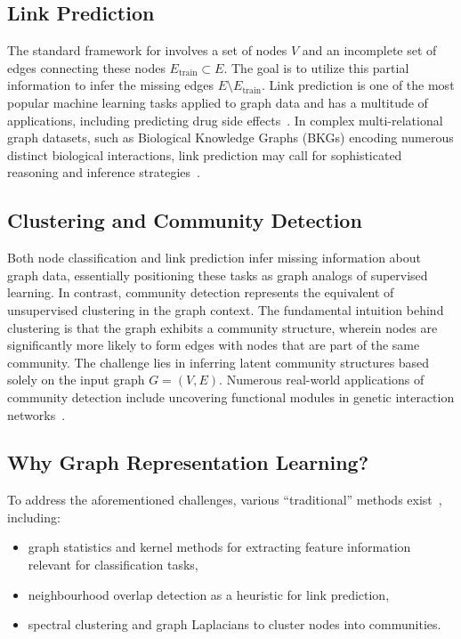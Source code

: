 \subsection{Link Prediction}
The standard framework for  involves a set of nodes $ V $ and an incomplete set of edges connecting these nodes $ E_\text{train} \subset E $. The goal is to utilize this partial information to infer the missing edges $ E \setminus E_\text{train} $. Link prediction is one of the most popular machine learning tasks applied to graph data and has a multitude of applications, including predicting drug side effects~\cite{Zitnik2018ModelingPolypharmacySideEffectsGCN}. In complex multi-relational graph datasets, such as Biological Knowledge Graphs (BKGs) encoding numerous distinct biological interactions, link prediction may call for sophisticated reasoning and inference strategies~\cite{Nickel2015ReviewRelationalMLKG}.

\subsection{Clustering and Community Detection}
Both node classification and link prediction infer missing information about graph data, essentially positioning these tasks as graph analogs of supervised learning. In contrast, community detection represents the equivalent of unsupervised clustering in the graph context. The fundamental intuition behind clustering is that the graph exhibits a community structure, wherein nodes are significantly more likely to form edges with nodes that are part of the same community. The challenge lies in inferring latent community structures based solely on the input graph $ G = (V, E) $. Numerous real-world applications of community detection include uncovering functional modules in genetic interaction networks~\cite{Agrawal2018LargeScaleAnalysisDiseasePathwaysHumanInteractome}.

\subsection{Why Graph Representation Learning?}
To address the aforementioned challenges, various ``traditional'' methods exist~\cite{Hamilton2020GraphRL}, including:
\begin{itemize}
    \item graph statistics and kernel methods for extracting feature information relevant for classification tasks,
    \item neighbourhood overlap detection as a heuristic for link prediction,
    \item spectral clustering and graph Laplacians to cluster nodes into communities.
\end{itemize}

